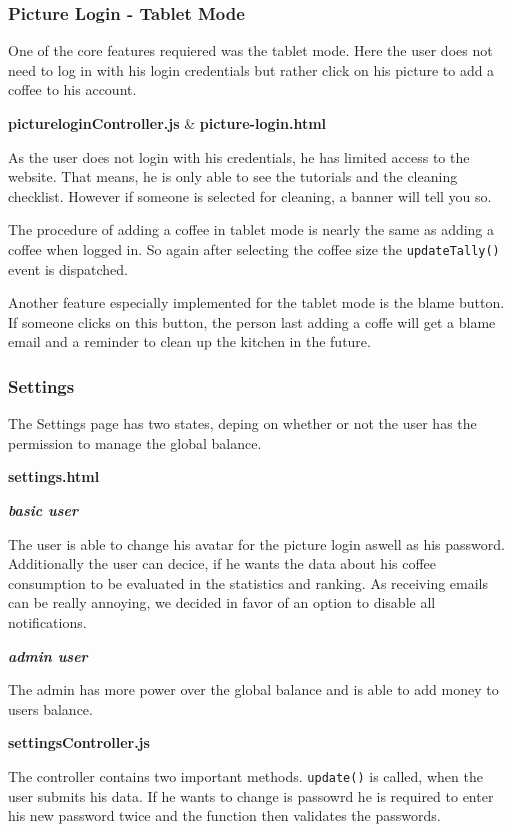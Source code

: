 \subsubsection{Picture Login - Tablet
Mode}\label{picture-login---tablet-mode}

One of the core features requiered was the tablet mode. Here the user
does not need to log in with his login credentials but rather click on
his picture to add a coffee to his account.

\textbf{pictureloginController.js} \& \textbf{picture-login.html}

As the user does not login with his credentials, he has limited access
to the website. That means, he is only able to see the tutorials and the
cleaning checklist. However if someone is selected for cleaning, a
banner will tell you so.

The procedure of adding a coffee in tablet mode is nearly the same as
adding a coffee when logged in. So again after selecting the coffee size
the \texttt{updateTally()} event is dispatched.

Another feature especially implemented for the tablet mode is the blame
button. If someone clicks on this button, the person last adding a coffe
will get a blame email and a reminder to clean up the kitchen in the
future.

\subsubsection{Settings}\label{settings-1}

The Settings page has two states, deping on whether or not the user has
the permission to manage the global balance.

\textbf{settings.html}

\textbf{\emph{basic user}}

The user is able to change his avatar for the picture login aswell as
his password. Additionally the user can decice, if he wants the data
about his coffee consumption to be evaluated in the statistics and
ranking. As receiving emails can be really annoying, we decided in favor
of an option to disable all notifications.

\textbf{\emph{admin user}}

The admin has more power over the global balance and is able to add
money to users balance.

\textbf{settingsController.js}

The controller contains two important methods. \texttt{update()} is
called, when the user submits his data. If he wants to change is
passowrd he is required to enter his new password twice and the function
then validates the passwords.

